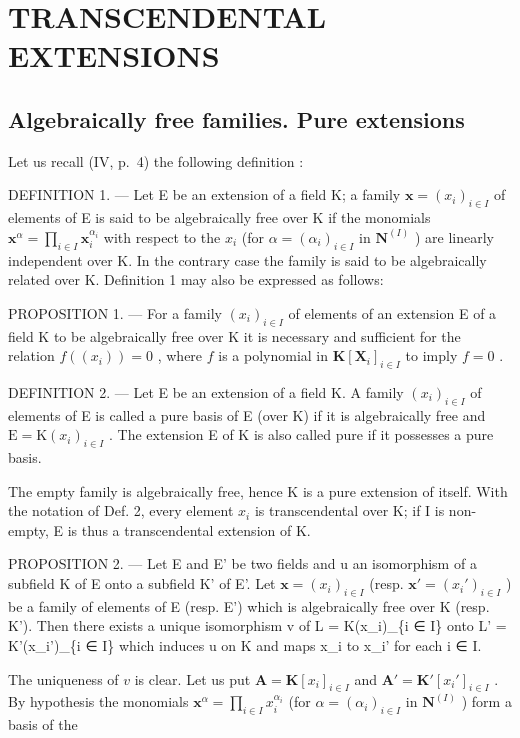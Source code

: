 \section{TRANSCENDENTAL EXTENSIONS}

\subsection{Algebraically free families. Pure extensions}

Let us recall (IV, p.~4) the following definition :

DEFINITION 1. --- Let E be an extension of a field K; a family \(\mathbf{x} = (x_i)_{i \in I}\) of elements of E is said to be algebraically free over K if the monomials \(\mathbf{x}^\alpha = \prod_{i \in I} \mathbf{x}_i^{\alpha_i}\) with respect to the \(x_i\) (for \(\alpha = (\alpha_i)_{i \in I}\) in \(\mathbf{N}^{(I)}\) ) are linearly independent over K. In the contrary case the family is said to be algebraically related over K. Definition 1 may also be expressed as follows:

PROPOSITION 1. --- For a family \((x_{i})_{i\in I}\) of elements of an extension E of a field K to be algebraically free over K it is necessary and sufficient for the relation \(f((x_i)) = 0\) , where \(f\) is a polynomial in \(\mathbf{K}[\mathbf{X}_i]_{i\in I}\) to imply \(f = 0\) .

DEFINITION 2. --- Let E be an extension of a field K. A family \((x_{i})_{i\in I}\) of elements of E is called a pure basis of E (over K) if it is algebraically free and \(\mathrm{E}=\mathrm{K}(x_{i})_{i\in I}\) . The extension E of K is also called pure if it possesses a pure basis.

The empty family is algebraically free, hence K is a pure extension of itself. With the notation of Def. 2, every element \(x_{i}\) is transcendental over K; if I is non-empty, E is thus a transcendental extension of K.

PROPOSITION 2. --- Let E and E' be two fields and u an isomorphism of a subfield K of E onto a subfield K' of E'. Let \(\mathbf{x} = (x_i)_{i \in I}\) (resp. \(\mathbf{x}' = (x_i')_{i \in I}\) ) be a family of elements of E (resp. E') which is algebraically free over K (resp. K'). Then there exists a unique isomorphism v of L = K(x\_i)\_\{i ∈ I\} onto L' = K'(x\_i')\_\{i ∈ I\} which induces u on K and maps x\_i to x\_i' for each i ∈ I.

The uniqueness of \(v\) is clear. Let us put \(\mathbf{A} = \mathbf{K}[x_i]_{i \in I}\) and \(\mathbf{A}' = \mathbf{K}'[x_i']_{i \in I}\) . By hypothesis the monomials \(\mathbf{x}^\alpha = \prod_{i \in I} x_i^{\alpha_i}\) (for \(\alpha = (\alpha_i)_{i \in I}\) in \(\mathbf{N}^{(I)}\) ) form a basis of the

